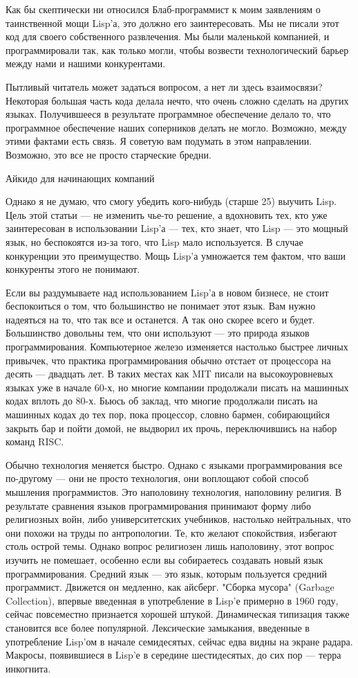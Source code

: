 \documentclass[ebook,12pt,oneside,openany]{memoir}
\begin{document}
Как бы скептически ни относился Блаб-программист к моим заявлениям о
таинственной мощи Lisp'а, это должно его заинтересовать. Мы не писали
этот код для своего собственного развлечения. Мы были маленькой
компанией, и программировали так, как только могли, чтобы возвести
технологический барьер между нами и нашими конкурентами.

Пытливый читатель может задаться вопросом, а нет ли здесь взаимосвязи?
Некоторая большая часть кода делала нечто, что очень сложно сделать на
других языках. Получившееся в результате программное обеспечение
делало то, что программное обеспечение наших соперников делать не
могло. Возможно, между этими фактами есть связь. Я советую вам
подумать в этом направлении. Возможно, это все не просто старческие
бредни.

Айкидо для начинающих компаний

Однако я не думаю, что смогу убедить кого-нибудь (старше 25) выучить
Lisp. Цель этой статьи — не изменить чье-то решение, а вдохновить тех,
кто уже заинтересован в использовании Lisp'а — тех, кто знает, что
Lisp — это мощный язык, но беспокоятся из-за того, что Lisp мало
используется. В случае конкуренции это преимущество. Мощь Lisp'а
умножается тем фактом, что ваши конкуренты этого не понимают.

Если вы раздумываете над использованием Lisp'а в новом бизнесе, не
стоит беспокоиться о том, что большинство не понимает этот язык. Вам
нужно надеяться на то, что так все и останется. А так оно скорее всего
и будет. Большинство довольны тем, что они используют — это природа
языков программирования. Компьютерное железо изменяется настолько
быстрее личных привычек, что практика программирования обычно отстает
от процессора на десять — двадцать лет. В таких местах как MIT писали
на высокоуровневых языках уже в начале 60-х, но многие компании
продолжали писать на машинных кодах вплоть до 80-х. Бьюсь об заклад,
что многие продолжали писать на машинных кодах до тех пор, пока
процессор, словно бармен, собирающийся закрыть бар и пойти домой, не
выдворил их прочь, переключившись на набор команд RISC.

Обычно технология меняется быстро. Однако с языками программирования
все по-другому — они не просто технология, они воплощают собой способ
мышления программистов. Это наполовину технология, наполовину религия.
В результате сравнения языков программирования принимают форму либо
религиозных войн, либо университетских учебников, настолько
нейтральных, что они похожи на труды по антропологии. Те, кто желают
спокойствия, избегают столь острой темы. Однако вопрос религиозен лишь
наполовину, этот вопрос изучить не помешает, особенно если вы
собираетесь создавать новый язык программирования. Средний язык — это
язык, которым пользуется средний программист. Движется он медленно,
как айсберг. "Сборка мусора" (Garbage Collection), впервые введенная в
употребление в Lisp'е примерно в 1960 году, сейчас повсеместно
признается хорошей штукой. Динамическая типизация также становится все
более популярной. Лексические замыкания, введенные в употребление
Lisp'ом в начале семидесятых, сейчас едва видны на экране радара.
Макросы, появившиеся в Lisp'е в середине шестидесятых, до сих пор —
терра инкогнита.
\end{document}
